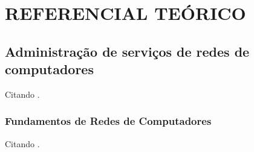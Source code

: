 \chapter{REFERENCIAL TEÓRICO}

\section{Administração de serviços de redes de computadores}
    
    Citando \cite{Kurose2014}.
    
\subsection{Fundamentos de Redes de Computadores}

    Citando \cite{Nakamura2007}.

    
